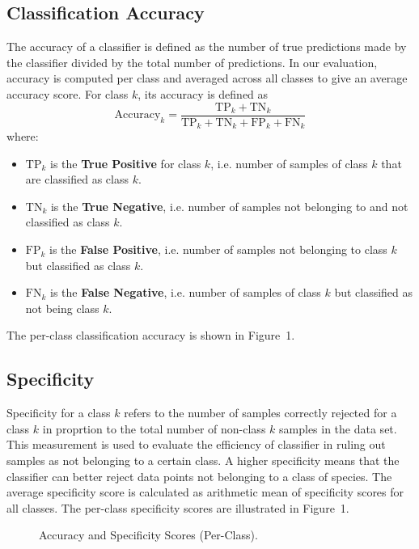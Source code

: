 \documentclass[]{report}   %
\begin{document}
\subsection*{Classification Accuracy}
The accuracy of a classifier is defined as the number of true predictions made by the
classifier divided by the total number of predictions. In our evaluation, accuracy
is computed per class and averaged across all classes to give an average accuracy
score. For class $k$, its accuracy is defined as
\begin{equation}
\textrm{Accuracy}_k = \frac{\textrm{TP}_k+\textrm{TN}_k}{\textrm{TP}_k+\textrm{TN}_k+\textrm{FP}_k+\textrm{FN}_k}
\end{equation}
where:
\begin{itemize}
\item $\textrm{TP}_k$ is the \textbf{True Positive} for class $k$, i.e. number of samples of class $k$ that are classified as class $k$.
\item $\textrm{TN}_k$ is the \textbf{True Negative}, i.e. number of samples not belonging to and not classified as class $k$.
\item $\textrm{FP}_k$ is the \textbf{False Positive}, i.e. number of samples not belonging to class $k$ but classified as class $k$.
\item $\textrm{FN}_k$ is the \textbf{False Negative}, i.e. number of samples of class $k$ but classified as not being class $k$.
\end{itemize}
The per-class classification accuracy is shown in Figure~1.
\newpage
\subsection*{Specificity}
Specificity for a class $k$ refers to the number of samples correctly rejected for a class
$k$ in proprtion to the total number of non-class $k$ samples in the data set. This measurement is used to evaluate the efficiency of classifier in ruling out samples as not belonging to a certain class. A higher specificity means that the classifier can
better reject data points not belonging to a class of species. The average specificity score is calculated as arithmetic mean of specificity scores for all classes. The per-class specificity scores are illustrated in Figure~1.


\begin{figure}
\label{fig:d}
\caption{Accuracy and Specificity Scores (Per-Class).}
    \centering
    \def\svgwidth{\columnwidth}
    
\end{figure}
\end{document}
